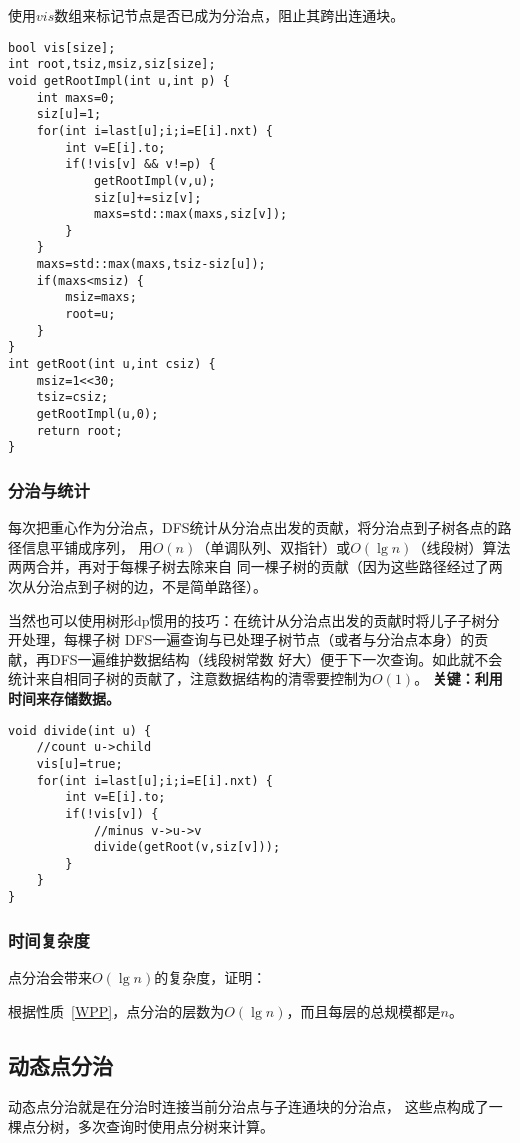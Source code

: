 使用$vis$数组来标记节点是否已成为分治点，阻止其跨出连通块。

\begin{lstlisting}[title=getRoot]
bool vis[size];
int root,tsiz,msiz,siz[size];
void getRootImpl(int u,int p) {
    int maxs=0;
    siz[u]=1;
    for(int i=last[u];i;i=E[i].nxt) {
        int v=E[i].to;
        if(!vis[v] && v!=p) {
            getRootImpl(v,u);
            siz[u]+=siz[v];
            maxs=std::max(maxs,siz[v]);
        }
    }
    maxs=std::max(maxs,tsiz-siz[u]);
    if(maxs<msiz) {
        msiz=maxs;
        root=u;
    }
}
int getRoot(int u,int csiz) {
    msiz=1<<30;
    tsiz=csiz;
    getRootImpl(u,0);
    return root;
}
\end{lstlisting}

\subsubsection{分治与统计}
每次把重心作为分治点，DFS统计从分治点出发的贡献，将分治点到子树各点的路径信息平铺成序列，
用$O(n)$（单调队列、双指针）或$O(\lg n)$（线段树）算法两两合并，再对于每棵子树去除来自
同一棵子树的贡献（因为这些路径经过了两次从分治点到子树的边，不是简单路径）。

当然也可以使用树形dp惯用的技巧：在统计从分治点出发的贡献时将儿子子树分开处理，每棵子树
DFS一遍查询与已处理子树节点（或者与分治点本身）的贡献，再DFS一遍维护数据结构（线段树常数
好大）便于下一次查询。如此就不会统计来自相同子树的贡献了，注意数据结构的清零要控制为$O(1)$。
{\bfseries 关键：利用时间来存储数据。}

\begin{lstlisting}[title=divide]
void divide(int u) {
    //count u->child
    vis[u]=true;
    for(int i=last[u];i;i=E[i].nxt) {
        int v=E[i].to;
        if(!vis[v]) {
            //minus v->u->v
            divide(getRoot(v,siz[v]));
        }
    }
}
\end{lstlisting}

\subsubsection{时间复杂度}
点分治会带来$O(\lg n)$的复杂度，证明：

根据性质~\ref{WPP}，点分治的层数为$O(\lg n)$，而且每层的总规模都是$n$。

\subsection{动态点分治}
动态点分治就是在分治时连接当前分治点与子连通块的分治点，
这些点构成了一棵点分树，多次查询时使用点分树来计算。

